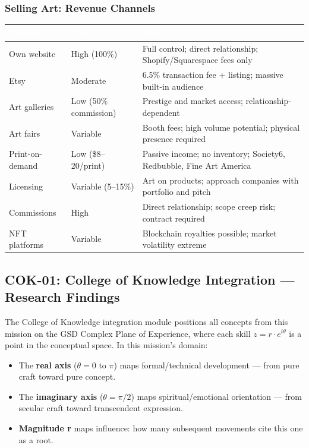 \documentclass[11pt,letterpaper]{article}
\newcommand{\tableheader}[1]{\textbf{\sffamily\textcolor{white}{#1}}}
\begin{document}
\subsubsection{Selling Art: Revenue Channels}

\begin{tabularx}{\textwidth}{L{3.5cm}L{2.5cm}X}
\toprule
{}
\tableheader{Channel} & \tableheader{Margin} & \tableheader{Notes} \\
\midrule
Own website & High (100\%) & Full control; direct relationship; Shopify/Squarespace fees only \\
Etsy & Moderate & 6.5\% transaction fee + listing; massive built-in audience \\
Art galleries & Low (50\% commission) & Prestige and market access; relationship-dependent \\
Art fairs & Variable & Booth fees; high volume potential; physical presence required \\
Print-on-demand & Low (\$8--20/print) & Passive income; no inventory; Society6, Redbubble, Fine Art America \\
Licensing & Variable (5--15\%) & Art on products; approach companies with portfolio and pitch \\
Commissions & High & Direct relationship; scope creep risk; contract required \\
NFT platforms & Variable & Blockchain royalties possible; market volatility extreme \\
\bottomrule
\end{tabularx}

\subsection{COK-01: College of Knowledge Integration --- Research Findings}

The College of Knowledge integration module positions all concepts from this mission on the GSD Complex Plane of Experience, where each skill $z = r \cdot e^{i\theta}$ is a point in the conceptual space. In this mission's domain:

\begin{itemize}[noitemsep]
  \item The \textbf{real axis} ($\theta = 0$ to $\pi$) maps formal/technical development --- from pure craft toward pure concept.
  \item The \textbf{imaginary axis} ($\theta = \pi/2$) maps spiritual/emotional orientation --- from secular craft toward transcendent expression.
  \item \textbf{Magnitude r} maps influence: how many subsequent movements cite this one as a root.
\end{itemize}
\end{document}

